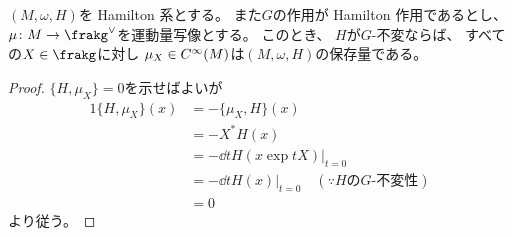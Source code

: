 \documentclass[report,dvipdfmx]{jlreq}
\begin{document}
%

\begin{theorem}
    $(M, \omega, H)$を Hamilton 系とする。
    また$G$の作用が Hamilton 作用であるとし、
    $\mu \colon M \to \frakg^\vee$を運動量写像とする。
    このとき、
    $H$が$G$-不変ならば、
    すべての$X \in \frakg$に対し
    $\mu_X \in C^\infty(M)$は$(M, \omega, H)$の保存量である。
\end{theorem}

\begin{proof}
    $\{ H, \mu_X \} = 0$を示せばよいが
    \begin{alignat}{1}
        \{ H, \mu_X \}(x)
            &=
                - \{ \mu_X, H \}(x)
                \\
            &=
                - X^* H (x)
                \\
            &=
                - \dd{t} H(x \exp tX) \Big|_{t = 0}
                \\
            &=
                - \dd{t} H(x) \Big|_{t = 0}
                \quad
                (\because \text{$H$の$G$-不変性})
                \\
            &=
                0
    \end{alignat}
    より従う。
\end{proof}
\end{document}
